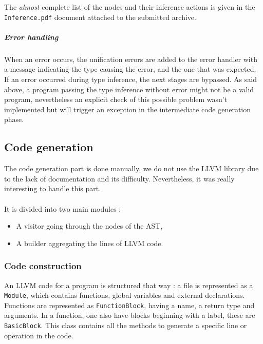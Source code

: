 \documentclass[a4paper,11pt]{article}
\begin{document}
The \textit{almost} complete list of the nodes and their inference actions is given in the \texttt{Inference.pdf} document attached to the submitted archive.
\subparagraph{Error handling} When an error occurs, the unification errors are added to the error handler with a message indicating the type causing the error, and the one that was expected. If an error occurred during type inference, the next stages are bypassed. As said above, a program passing the type inference without error might not be a valid program, nevertheless an explicit check of this possible problem wasn't implemented but will trigger an exception in the intermediate code generation phase.
\subsection{Code generation}

The code generation part is done manually, we do not use the LLVM library due to the lack of documentation and its difficulty. Nevertheless, it was really interesting to handle this part. 

\paragraph{}

It is divided into two main modules : 
\begin{itemize}
	\item A visitor going through the nodes of the AST,
	\item A builder aggregating the lines of LLVM code.
\end{itemize}

	\subsubsection{Code construction}

An LLVM code for a program is structured that way : a file is represented as a \texttt{Module}, which contains functions, global variables and external declarations. Functions are represented as \texttt{FunctionBlock}, having a name, a return type and arguments. In a function, one also have blocks beginning with a label, these are \texttt{BasicBlock}. This class contains all the methods to generate a specific line or operation in the code. 

\paragraph{}
\end{document}
